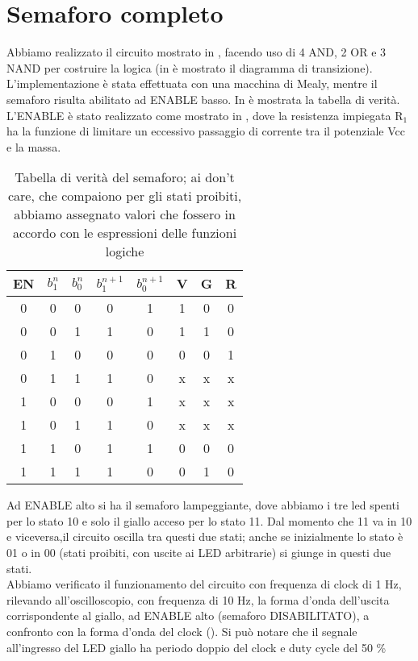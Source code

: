 \section{Semaforo completo}
Abbiamo realizzato il circuito mostrato in , facendo uso di 4 AND, 2 OR e 3 NAND per costruire la logica (in  è mostrato il diagramma di transizione). L'implementazione è stata effettuata con una macchina di Mealy, mentre il semaforo risulta abilitato ad ENABLE basso. In  è mostrata la tabella di verità. L'ENABLE è stato realizzato come mostrato in , dove la resistenza impiegata R$_1$ ha la funzione di limitare un eccessivo passaggio di corrente tra il potenziale Vcc e la massa.\\
\begin{table}[h]
	\centering
	\begin{tabular}{cccccccc}		
		 EN& $b_{1}^{n}$& $b_{0}^{n}$& $b_{1}^{n+1}$& $b_{0}^{n+1}$ &V & G& R\\
		 \midrule 
		  0 & 0 & 0 & 0 & 1 & 1 & 0 & 0 \\
		  0 & 0 & 1 & 1 & 0 & 1 & 1 & 0 \\
		  0 & 1 & 0 & 0 & 0 & 0 & 0 & 1 \\
          0 & 1 & 1 & 1 & 0 & x & x & x \\
		  1 & 0 & 0 & 0 & 1 & x & x & x \\
		  1 & 0 & 1 & 1 & 0 & x & x & x \\
		  1 & 1 & 0 & 1 & 1 & 0 & 0 & 0 \\
          1 & 1 & 1 & 1 & 0 & 0 & 1 & 0 \\          
 	\end{tabular}
	\caption{ Tabella di verità del semaforo; ai don't care, che compaiono per gli stati proibiti, abbiamo assegnato valori che fossero in accordo con le espressioni delle funzioni logiche }
	\label{t:tabella_verità}
\end{table}
Ad ENABLE alto si ha il semaforo lampeggiante, dove abbiamo i tre led spenti per lo stato 10 e solo il giallo acceso per lo stato 11. Dal momento che 11 va in 10 e viceversa,il circuito oscilla tra questi due stati; anche se inizialmente lo stato è 01 o in 00 (stati proibiti, con uscite ai LED arbitrarie) si giunge in questi due stati.\\
Abbiamo verificato il funzionamento del circuito con frequenza di clock di 1 Hz, rilevando all'oscilloscopio, con frequenza di 10 Hz, la forma d'onda dell'uscita corrispondente al giallo, ad ENABLE alto (semaforo DISABILITATO), a confronto con la forma d'onda del clock (). Si può notare che il segnale all'ingresso del LED giallo ha periodo doppio del clock e  duty cycle del 50 \%\\
